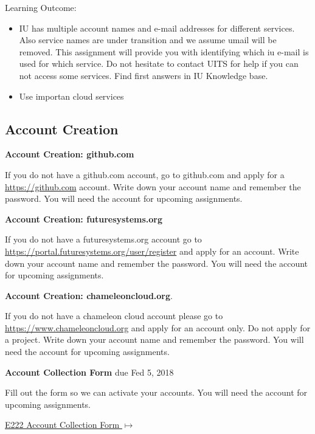 Learning Outcome:

\begin{itemize}
\item IU has multiple account names and e-mail addresses for different
  services. Also service names are under transition and we assume
  umail will be removed. This assignment will provide you with
  identifying which iu e-mail is used for which service. Do not
  hesitate to contact UITS for help if you can not access some
  services. Find first answers in IU Knowledge base.
\item Use importan cloud services
\end{itemize}


\subsection{Account Creation}

\begin{exercise}

  {\bf Account Creation: github.com}
  
  If you do not have a github.com
  account, go to github.com and apply for a \url{https://github.com}
  account. Write down your account name and remember the password. You
  will need the account for upcoming assignments.

\end{exercise}

\begin{exercise}

  {\bf Account Creation: futuresystems.org}
  
  If you do not have a futuresystems.org account go to
  \url{https://portal.futuresystems.org/user/register} and apply for an
  account. Write down your account name and remember the password. You
  will need the account for upcoming assignments.

\end{exercise}

\begin{exercise}
  {\bf Account Creation: chameleoncloud.org}. 
  
  If you do not have a chameleon cloud account please go to 
  \url{https://www.chameleoncloud.org} and apply for an
  account only. Do not apply for a project. Write down your account
  name and remember the password. You will need the account for
  upcoming assignments.
\end{exercise}

\begin{exercise}
   {\bf Account Collection Form } due Fed 5, 2018
 
 Fill out the form so we can activate your accounts. You will need the account for upcoming assignments.
 
  {\hfill \href{https://goo.gl/forms/W0MdgoJoY8F6Vt9Q2}{E222 Account Collection Form $\mapsto$}}
 

\end{exercise}

